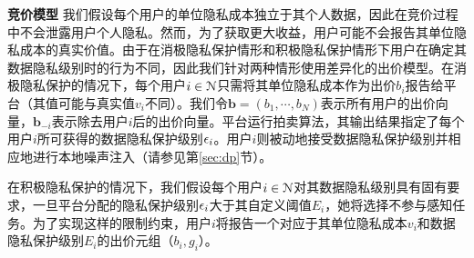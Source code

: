 	{\bfseries 竞价模型} 我们假设每个用户的单位隐私成本独立于其个人数据，因此在竞价过程中不会泄露用户个人隐私。然而，为了获取更大收益，用户可能不会报告其单位隐私成本的真实价值。由于在{\kaishu 消极隐私保护}情形和{\kaishu 积极隐私保护}情形下用户在确定其数据隐私级别时的行为不同，因此我们针对两种情形使用差异化的出价模型。在消极隐私保护的情况下，每个用户$i\in\mathcal{N}$只需将其单位隐私成本作为出价$b_i$报告给平台（其值可能与真实值$v_i$不同）。我们令$\mathbf{b}=(b_1,\cdots,b_N)$表示所有用户的出价向量，$\mathbf{b}_{-i}$表示除去用户$i$后的出价向量。平台运行拍卖算法，其输出结果指定了每个用户$i$所可获得的数据隐私保护级别$\epsilon_i$。用户$i$则被动地接受数据隐私保护级别并相应地进行本地噪声注入（请参见第\ref{sec:dp}节）。
	
	在积极隐私保护的情况下，我们假设每个用户$i\in\mathcal{N}$对其数据隐私级别具有固有要求，一旦平台分配的隐私保护级别$\epsilon_i$大于其自定义阈值$E_i$，她将选择不参与感知任务。为了实现这样的限制约束，用户$i$将报告一个对应于其单位隐私成本$v_i$和数据隐私保护级别$E_i$的出价元组（$b_i, g_i$）。	
	

